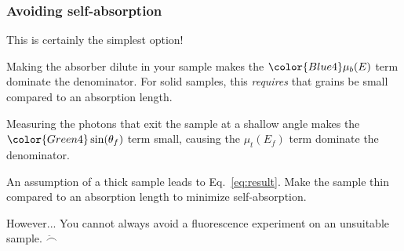 \documentclass[10pt, xcolor=x11names, compress, handout]{beamer}
\begin{document}
\begin{frame}
  \frametitle{Avoiding self-absorption}
  \begin{description}[Dilution]
  \item[Do transmission] This is certainly the simplest option!
  \item[Dilution] Making the absorber dilute in your sample makes the
    ${\color{Blue4}\mu_b(E)}$ term dominate the denominator. For solid
    samples, this \textit{requires} that grains be small compared to
    an absorption length.
  \item[Glancing exit angle] Measuring the photons that exit the
    sample at a shallow angle makes the $\color{Green4}\sin(\theta_f)$
    term small, causing the $\mu_t(E_f)$ term dominate the denominator.
  \item[Thin sample] An assumption of a thick sample leads to
    Eq.~\ref{eq:result}.  Make the sample thin compared to an
    absorption length to minimize self-absorption.
  \end{description}
  \begin{alertblock}{However...}
    You cannot always avoid a fluorescence experiment on an unsuitable
    sample. $\ddot\frown$
  \end{alertblock}
\end{frame}
\end{document}
